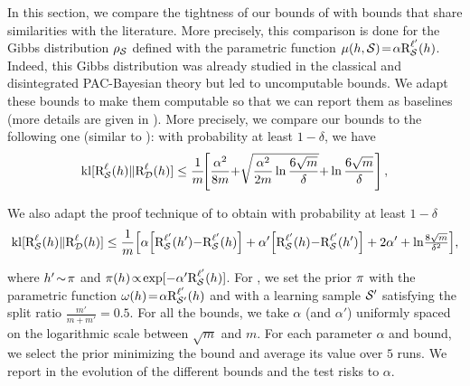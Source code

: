 \documentclass[twoside]{article}
\theoremstyle{plain}
\newif\ifnotappendix
\begin{document}
In this section, we compare the tightness of our bounds of  with bounds that share similarities with the literature.
More precisely, this comparison is done for the Gibbs distribution $\AQ$ defined with the parametric function $\mu(h,\Scal)\!=\!\alpha\RiskLossp_{\Scal}(h)$.
Indeed, this Gibbs distribution was already studied in the classical and disintegrated PAC-Bayesian theory but led to uncomputable bounds. 
We adapt these bounds to make them computable so that we can report them as baselines (more details are given in ).
More precisely, we compare our bounds to the following one (similar to \citet{lever2013tighter}): with probability at least $1{-}\delta$, we have
\newcommand{\eqcomparisonlever}{%
\ifnotappendix%
\begin{align}
\kl[\RiskLoss_{\Scal}(h)\|\RiskLoss_{\Dcal}(h)]\!\le\!{\textstyle\frac{1}{m}\!\!\LB\frac{\alpha^2}{8m}{+}\sqrt{\!\frac{\alpha^2}{2m}\!\ln\!\frac{6\sqrt{m}}{\delta}}{+}\ln\!\frac{6\sqrt{m}}{\delta}\RB}.\label{eq:comparaison-lever}
\end{align}
\else%
\begin{align*}
\kl[\RiskLoss_{\Scal}(h)\|\RiskLoss_{\Dcal}(h)]\le\frac{1}{m}\!\!\LB\frac{\alpha^2}{8m}{+}\sqrt{\frac{\alpha^2}{2m}\ln\frac{6\sqrt{m}}{\delta}}{+}\ln\frac{6\sqrt{m}}{\delta}\RB,
\end{align*}
\fi}
\eqcomparisonlever
We also adapt the proof technique of \citet{dziugaite2018data} to obtain with probability at least $1{-}\delta$
\newcommand{\eqcomparisondziugaite}{%
\ifnotappendix%
\begin{align}
\kl[\RiskLoss_{\Scal}(h) \|\RiskLoss_{\Dcal}(h)] \le \frac{1}{m}\Big[ \alpha\!\LB\RiskLossp_{\Scal}(h'){-}\RiskLossp_{\Scal}(h)\RB\nonumber\\
+ \alpha'\Big[\RiskLossp_{\Scal}(h){-}\RiskLossp_{\Scal}(h')\Big] + 2\alpha' + \ln\!\tfrac{8\sqrt{m}}{\delta^2}\Big],\label{eq:comparaison-dziugaite}
\end{align}
\else%
\begin{align*}
\kl[\RiskLoss_{\Scal}(h) \|\RiskLoss_{\Dcal}(h)] \le \frac{1}{m}\Big[ \alpha\!\LB\RiskLossp_{\Scal}(h'){-}\RiskLossp_{\Scal}(h)\RB + \alpha'\Big[\RiskLossp_{\Scal}(h){-}\RiskLossp_{\Scal}(h')\Big] + 2\alpha' + \ln\!\tfrac{8\sqrt{m}}{\delta^2}\Big],
\end{align*}
\fi}
\eqcomparisondziugaite
{}
where $h'\!\sim\! \P$ and $\P(h)\!\propto\!\exp[-\alpha'\RiskLossp_{\Scal}(h)]$.
For , we set the prior $\P$ with the parametric function $\omega(h)\!=\!\alpha\RiskLossp_{\Scal'}(h)$ and with a learning sample $\Scal'$ satisfying the split ratio $\frac{m'}{m\!+\!m'} \!=\! 0.5$.
For all the bounds, we take $\alpha$ (and $\alpha'$) uniformly spaced on the logarithmic scale between $\sqrt{m}$ and $m$.
For each parameter $\alpha$ and bound, we select the prior minimizing the bound and average its value over $5$ runs.
We report in  the evolution of the different bounds and the test risks \wrt to $\alpha$.
\end{document}
